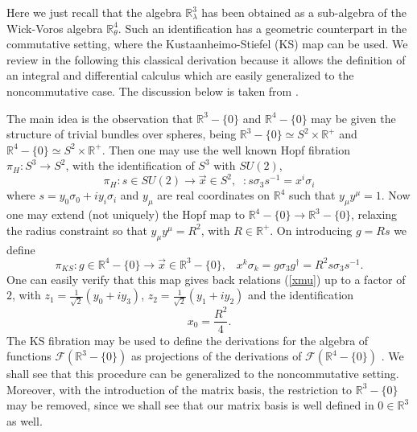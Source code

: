 \documentclass[a4paper,11pt]{article}
\numberwithin{equation}{section}
\newcommand{\be}{\begin{equation}}
\newcommand{\ee}{\end{equation}}
\newcommand{\eqn}[1]{(\ref{#1})}
\newcommand\gR{{\mathbb R}}
\def\gR{{\mathbb R}}
\theoremstyle{nonumberplain}
\begin{document}
Here we just recall that the algebra $\gR^3_\lambda$ has been obtained as a sub-algebra of the Wick-Voros algebra $\gR^4_\theta$. Such an identification 
 has a geometric counterpart in the commutative setting, where the Kustaanheimo-Stiefel (KS) map \cite{KS} can be used.  We review in the following this classical derivation because it allows  the definition of an integral and differential calculus which are easily generalized to the noncommutative case. The discussion below is taken from \cite{V14}. 
 
 
 The main idea is the observation that $\gR^3-\{0\}$ and $\gR^4-\{0\}$ may be given the structure of trivial bundles over spheres, being $\gR^3-\{0\}\simeq S^2\times\gR^+$ and $\gR^4-\{0\}\simeq S^2\times \gR^+$. Then one may use the well known Hopf fibration $\pi_H : S^3\rightarrow S^2$, with the identification of $S^3$ with $SU(2)$,
 \be
 \pi_H: s\in SU(2)\rightarrow \vec x \in S^2, \;\; : s\sigma_3 s^{-1}= x^i \sigma_i
 \ee
 where $s= y_0\sigma_0+ i y_i \sigma_i$ and $y_\mu$ are real coordinates on $\gR^4$ such that $y_\mu y^\mu=1$. Now one may extend (not uniquely)  the Hopf  map to $\gR^4-\{0\}\rightarrow \gR^3-\{0\}$, relaxing the radius  constraint so that $y_\mu y^\mu=R^2$, with $R\in \gR^+$. On introducing $g= R s$ we define
 \be
 \pi_{KS}: g \in\gR^4-\{0\}\rightarrow \vec x\in \gR^3-\{0\}, \;\;\; x^k\sigma_k=g \sigma_3 g^\dag=  R^2 s\sigma_3 s^{-1}. \label{KS}
 \ee
 One can easily verify that this map gives back relations \eqn{xmu} up to a factor of $2$, with $z_1= \frac{1}{\sqrt{2}} (y_0+i y_3)$, $z_2=\frac{1}{\sqrt{2}}(y_1+i y_2)$ and the identification
 \be x_0=\frac{ R^2}{4}. \label{rR}
 \ee
 The KS fibration may be used to define the derivations for the algebra of functions $\mathcal{F}(\gR^3-\{0\})$ as projections of the derivations of $\mathcal{F}(\gR^4-\{0\})$ \cite{DMV05}. We shall see that this procedure can be generalized to  the noncommutative setting. Moreover, with the introduction of the matrix basis, the restriction to $\gR^3-\{0\}$ may be removed, since we shall see that our matrix basis is well defined in $0\in \gR^3$ as well.
\end{document}

